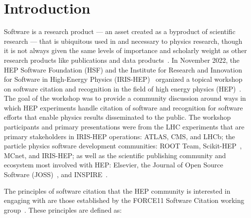 \section{Introduction}\label{sec:introduction}
Software is a research product --- an asset created as a byproduct of scientific research --- that is ubiquitous used in and necessary to physics research, though it is not always given the same levels of importance and scholarly weight as other research products like publications and data products~\cite{Cranmer:2021urp}.
In November 2022, the HEP Software Foundation (HSF) and the Institute for Research and Innovation for Software in High-Energy Physics (IRIS-HEP)~\cite{S2I2HEPSP,IRISHEPWEB} organized a topical workshop on software citation and recognition in the field of high energy physics (HEP)~\cite{software_citation_workshop_report,software_citation_indico}.
The goal of the workshop was to provide a community discussion around ways in which HEP experiments handle citation of software and recognition for software efforts that enable physics results disseminated to the public.
The workshop participants and primary presentations were from the LHC experiments that are primary stakeholders in IRIS-HEP operations: ATLAS, CMS, and LHCb; the particle physics software development communities: ROOT Team, Scikit-HEP~\cite{Rodrigues:2020syo}, MCnet, and IRIS-HEP; as well as the scientific publishing community and ecosystem most involved with HEP: Elsevier, the Journal of Open Source Software (JOSS)~\cite{smith_journal_2018}, and INSPIRE~\cite{INSPIRE}.

The principles of software citation that the HEP community is interested in engaging with are those established by the FORCE11 Software Citation working group~\cite{smith_software_2016}.
These principles are defined as:

